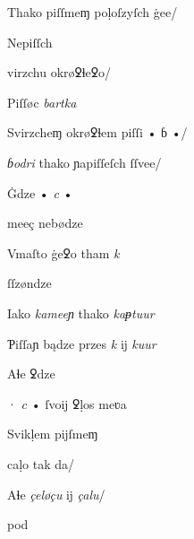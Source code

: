 {\splitverse

Thako piſſmeɱ poḷoſzyſch ġee/

\newversesubline Nepiſſch 


\splitverse virzchu okrøꝿɬeꝿo/

\newversesubline Piſſøc \textit{bartka} \textit{}


\fullverselines

 \textit{} Svirzcheɱ okrøꝿɬem piſſi • ɓ •/


\splitverse

\textit{ɓodri} thako ɲapiſſeſch ſſvee/


\indentVerse Ġdze • \textit{c} • 


\splitverse

 meeç nebødze

\indentVerse Vmaſto ġeꝿo tham \textit{k} 


\splitverse

ſſzøndze

\indentVerse Iako \textit{kameeɲ} thako \textit{kaᵽtuur} 

\newpage

\splitverse

Ƥiſſaɲ bądze przes \textit{k} ĳ \textit{kuur}

\indentVerse Aɬe ꝿdze 


\splitverse

· \textit{c} • ſvoĳ ꝿḷos meʋa

\indentVerse Svikḷem pĳſmeɱ  


\splitverse

caḷo tak da/

\indentVerse Aɬe \textit{çeløçu} ĳ \textit{çalu}/

\indentVerse  pod

}
